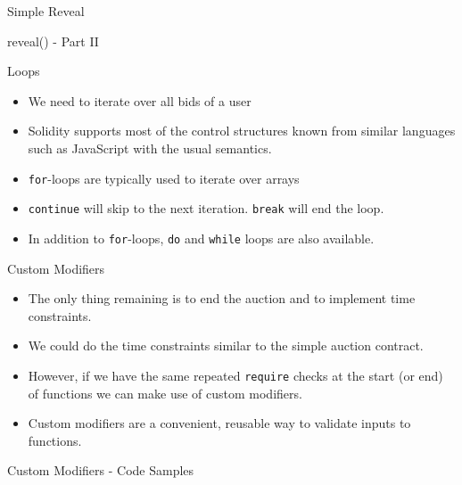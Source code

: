\documentclass[]{beamer}
\begin{document}
\begin{frame}{Simple Reveal}
\vspace{.3cm}
	\begin{samplecode}{reveal() - Part II}
		
	\end{samplecode}
\end{frame}

\begin{frame}{Loops}
	\begin{itemize}
		\item<1->We need to iterate over all bids of a user
		\item<2->Solidity supports most of the control structures known from similar languages such as JavaScript with the usual semantics.
		\item<3->\texttt{for}-loops are typically used to iterate over arrays
		\item<5->\texttt{continue} will skip to the next iteration. \texttt{break} will end the loop.
		\item<6->In addition to \texttt{for}-loops, \texttt{do} and \texttt{while} loops are also available.
	\end{itemize}

	
\end{frame}

\begin{frame}{Custom Modifiers}
	\begin{itemize}
		\item<1-> The only thing remaining is to end the auction and to implement time constraints.
		\item<2-> We could do the time constraints similar to the simple auction contract.
		\item<3-> However, if we have the same repeated \texttt{require} checks at the start (or end) of functions we can make use of custom modifiers.
		\item<4-> Custom modifiers are a convenient, reusable way to validate inputs to functions.
	\end{itemize}
\end{frame}

\begin{frame}{Custom Modifiers - Code Samples}
	\uncover<1->{
	\begin{samplecode}{Only Before}
		
	\end{samplecode}
	}
	\uncover<2->{
	\begin{samplecode}{Only After}
		
	\end{samplecode}
	}
\end{frame}
\end{document}
